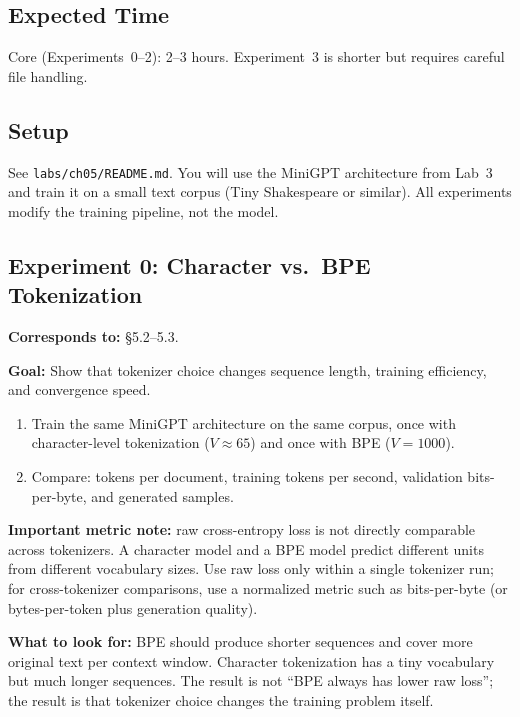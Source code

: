 \subsection*{Expected Time}

Core (Experiments~0--2): 2--3 hours. Experiment~3 is shorter but requires careful file handling.

\subsection*{Setup}

See \texttt{labs/ch05/README.md}. You will use the MiniGPT architecture from Lab~3 and train it on a small text corpus (Tiny Shakespeare or similar). All experiments modify the training pipeline, not the model.

\subsection*{Experiment 0: Character vs.\ BPE Tokenization}

\textbf{Corresponds to:} \S5.2--5.3.

\textbf{Goal:} Show that tokenizer choice changes sequence length, training efficiency, and convergence speed.

\begin{enumerate}[nosep]
    \item Train the same MiniGPT architecture on the same corpus, once with character-level tokenization ($V \approx 65$) and once with BPE ($V = 1000$).
    \item Compare: tokens per document, training tokens per second, validation bits-per-byte, and generated samples.
\end{enumerate}

\textbf{Important metric note:} raw cross-entropy loss is not directly comparable across tokenizers. A character model and a BPE model predict different units from different vocabulary sizes. Use raw loss only within a single tokenizer run; for cross-tokenizer comparisons, use a normalized metric such as bits-per-byte (or bytes-per-token plus generation quality).

\textbf{What to look for:} BPE should produce shorter sequences and cover more original text per context window. Character tokenization has a tiny vocabulary but much longer sequences. The result is not ``BPE always has lower raw loss''; the result is that tokenizer choice changes the training problem itself.

